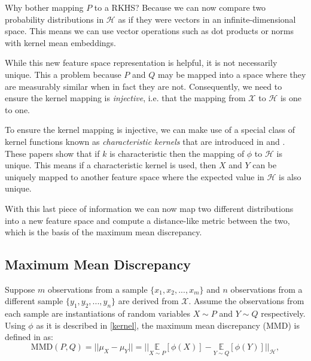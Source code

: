Why bother mapping $P$ to a RKHS? Because we can now compare two probability distributions in $\mathcal{H}$ as if they were vectors in an infinite-dimensional space. This means we can use vector operations such as dot products or norms with kernel mean embeddings.

While this new feature space representation is helpful, it is not necessarily unique. This a problem because $P$ and $Q$ may be mapped into a space where they are measurably similar when in fact they are not. Consequently, we need to ensure the kernel mapping is \textit{injective}, i.e. that the mapping from $\mathcal{X}$ to  $\mathcal{H}$ is one to one. %

To ensure the kernel mapping is injective, we can make use of a special class of kernel functions known as \textit{characteristic kernels} that are introduced in \cite{fukumizu2008kernel} and \cite{sriperumbudur2011universality}. These papers show that if $k$ is characteristic then the mapping of $\phi$ to $\mathcal{H}$ is unique. This means if a characteristic kernel is used, then $X$ and $Y$ can be uniquely mapped to another feature space where the expected value in $\mathcal{H}$ is also unique. 

With this last piece of information we can now map two different distributions into a new feature space and compute a distance-like metric between the two, which is the basis of the maximum mean discrepancy.   %

\subsection{Maximum Mean Discrepancy}
Suppose $m$ observations from a sample $\{x_1, x_2, ..., x_m\}$ and $n$ observations from a different sample $\{y_1, y_2, ..., y_n\}$ are derived from $\mathcal{X}$. Assume the observations from each sample are instantiations of random variables $X \sim  P$ and $Y \sim Q$ respectively. Using $\phi$ as it is described in \ref{kernel}, the maximum mean discrepancy (MMD) is defined in \cite{smola2007hilbert} as:
\begin{equation}
\label{mmd_theory}
\text{MMD}(P,Q)=||\mu_X - \mu_Y ||=|| \underset{X \sim P}{\mathbb{E}}[\phi(X)] -  \underset{Y \sim Q}{\mathbb{E}}[\phi(Y)]||_\mathcal{H},
\end{equation}

